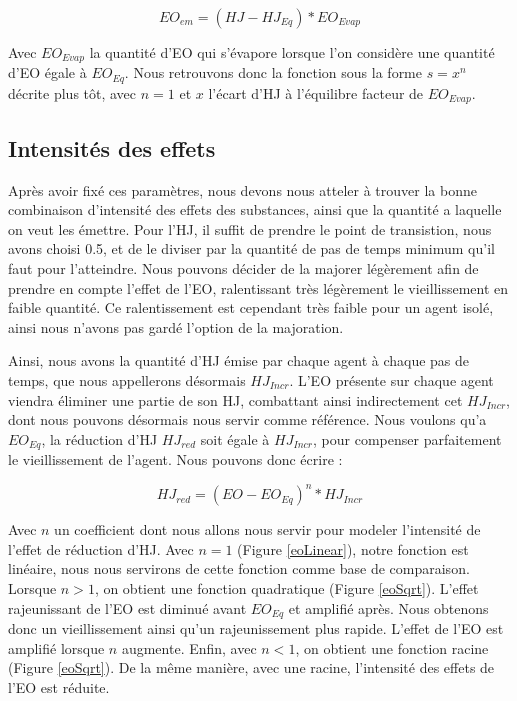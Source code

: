 	\begin{equation}
		EO_{em} = (HJ - HJ_{Eq}) * EO_{Evap}
	\label{eoEM}
	\end{equation}

Avec $EO_{Evap}$ la quantité d'EO qui s'évapore lorsque l'on considère une quantité d'EO égale à $EO_{Eq}$. Nous retrouvons donc la fonction sous la forme $s=x^n$ décrite plus tôt, avec $n = 1$ et $x$ l'écart d'HJ à l'équilibre facteur de $EO_{Evap}$.
	
	
	\subsection{Intensités des effets}	
	Après avoir fixé ces paramètres, nous devons nous atteler à trouver la bonne combinaison d'intensité des effets des substances, ainsi que la quantité a laquelle on veut les émettre. Pour l'HJ, il suffit de prendre le point de transistion, nous avons choisi 0.5, et de le diviser par la quantité de pas de temps minimum qu'il faut pour l'atteindre. Nous pouvons décider de la majorer légèrement afin de prendre en compte l'effet de l'EO, ralentissant très légèrement le vieillissement en faible quantité. Ce ralentissement est cependant très faible pour un agent isolé, ainsi nous n'avons pas gardé l'option de la majoration.
	
	Ainsi, nous avons la quantité d'HJ émise par chaque agent à chaque pas de temps, que nous appellerons désormais $HJ_{Incr}$. L'EO présente sur chaque agent viendra éliminer une partie de son HJ, combattant ainsi indirectement cet $HJ_{Incr}$, dont nous pouvons désormais nous servir comme référence. Nous voulons qu'a $EO_{Eq}$, la réduction d'HJ $HJ_{red}$ soit égale à $HJ_{Incr}$, pour compenser parfaitement le vieillissement de l'agent. Nous pouvons donc écrire :
	
	\begin{equation}
		 HJ_{red} = (EO - EO_{Eq})^n * HJ_{Incr}
	\label{hjRED}
	\end{equation}
	
	Avec $n$ un coefficient dont nous allons nous servir pour modeler l'intensité de l'effet de réduction d'HJ. Avec $n=1$ (Figure \ref{eoLinear}), notre fonction est linéaire, nous nous servirons de cette fonction comme base de comparaison. Lorsque $n>1$, on obtient une fonction quadratique (Figure \ref{eoSqrt}). L'effet rajeunissant de l'EO est diminué avant $EO_{Eq}$ et amplifié après. Nous obtenons donc un vieillissement ainsi qu'un rajeunissement plus rapide. L'effet de l'EO est amplifié lorsque $n$ augmente. Enfin, avec $n < 1$, on obtient une fonction racine (Figure \ref{eoSqrt}). De la même manière, avec une racine, l'intensité des effets de l'EO est réduite.
	
